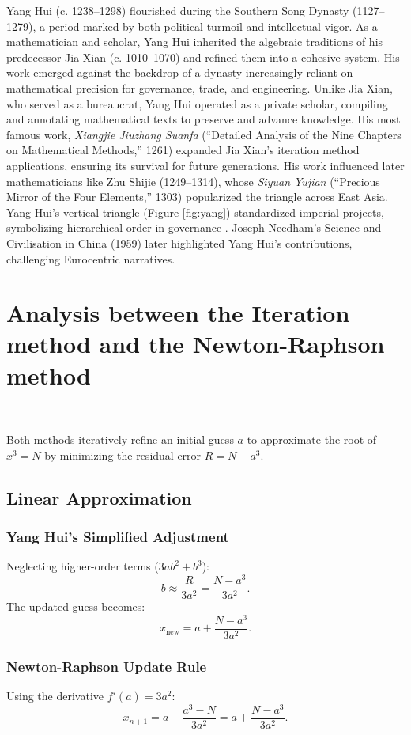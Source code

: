 \documentclass{article}
\begin{document}
Yang Hui (c. 1238–1298) flourished during the Southern Song Dynasty (1127–1279), a period marked by both political turmoil and intellectual vigor. As a mathematician and scholar, Yang Hui inherited the algebraic traditions of his predecessor Jia Xian (c. 1010–1070) and refined them into a cohesive system. His work emerged against the backdrop of a dynasty increasingly reliant on mathematical precision for governance, trade, and engineering. Unlike Jia Xian, who served as a bureaucrat, Yang Hui operated as a private scholar, compiling and annotating mathematical texts to preserve and advance knowledge. His most famous work, \textit{Xiangjie Jiuzhang Suanfa} (“Detailed Analysis of the Nine Chapters on Mathematical Methods,” 1261) expanded Jia Xian's iteration method applications, ensuring its survival for future generations. His work influenced later mathematicians like Zhu Shijie (1249–1314), whose \textit{Siyuan Yujian} (“Precious Mirror of the Four Elements,” 1303) popularized the triangle across East Asia. Yang Hui’s vertical triangle (Figure \ref{fig:yang}) standardized imperial projects, symbolizing hierarchical order in governance \citep{needham1993}. Joseph Needham’s Science and Civilisation in China (1959) later highlighted Yang Hui’s contributions, challenging Eurocentric narratives.

\section{Analysis between the Iteration method and the Newton-Raphson method}

~

Both methods iteratively refine an initial guess \(a\) to approximate the root of \(x^3 = N\) by minimizing the residual error \(R = N - a^3\).

\subsection{Linear Approximation}
\subsubsection{Yang Hui's Simplified Adjustment}
Neglecting higher-order terms (\(3ab^2 + b^3\)):
\[
b \approx \frac{R}{3a^2} = \frac{N - a^3}{3a^2}.
\]
The updated guess becomes:
\[
x_{\text{new}} = a + \frac{N - a^3}{3a^2}.
\]

\subsubsection{Newton-Raphson Update Rule}
Using the derivative \(f'(a) = 3a^2\):
\[
x_{n+1} = a - \frac{a^3 - N}{3a^2} = a + \frac{N - a^3}{3a^2}.
\]
\end{document}
